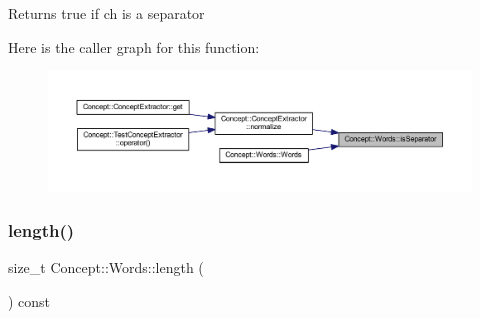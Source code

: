 \begin{DoxyReturn}{Returns}
true if ch is a separator 
\end{DoxyReturn}
Here is the caller graph for this function\+:\nopagebreak
\begin{figure}[H]
\begin{center}
\leavevmode
\includegraphics[width=350pt]{class_concept_1_1_words_a82004181ac36a8e592e3ddba2f314840_icgraph}
\end{center}
\end{figure}
\mbox{\label{class_concept_1_1_words_aecd76499829e2452564918a777ca8016}} 
\subsubsection{\texorpdfstring{length()}{length()}}
{\footnotesize\ttfamily size\+\_\+t Concept\+::\+Words\+::length (\begin{DoxyParamCaption}{ }\end{DoxyParamCaption}) const\hspace{0.3cm}{\ttfamily [inline]}}

